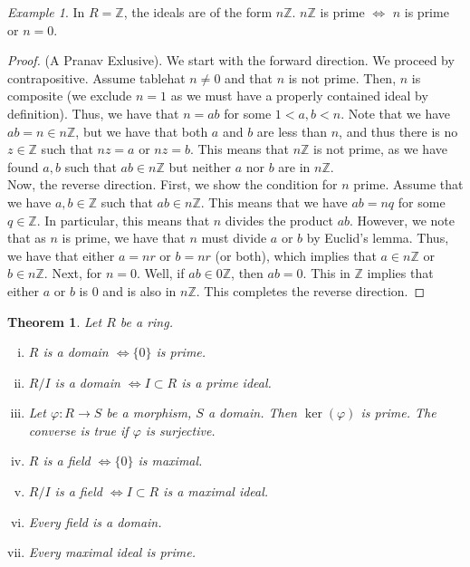 \documentclass{amsart}
\newcommand{\ZZ}{\mathbb{Z}}
\newtheorem{thm}{Theorem}[section]
\theoremstyle{definition}
\theoremstyle{remark}
\newtheorem*{ex}{Example}
\begin{document}
\begin{ex}
    In $R = \ZZ$, the ideals are of the form $n\ZZ$. $n\ZZ$ is prime $\iff$ $n$ is prime or $n = 0$.
\end{ex}
\begin{proof}
    (A Pranav Exlusive). We start with the forward direction. We proceed by contrapositive.
    Assume tablehat $n \neq 0$ and that $n$ is not prime. Then, $n$ is composite (we exclude $n = 1$ as
    we must have a properly contained ideal by definition). Thus, we have that $n = ab$ for some $1 < a,b < n$.
    Note that we have $ab = n \in n\ZZ$, but we have that both $a$ and $b$ are less than $n$, and thus there is no $z \in \ZZ$
    such that $nz = a$ or $nz = b$. This means that $n\ZZ$ is not prime, as we have found $a,b$ such that
    $ab \in n\ZZ$ but neither $a$ nor $b$ are in $n\ZZ$. \\
    Now, the reverse direction. First, we show the condition for $n$ prime. Assume that we have $a,b \in \ZZ$ such that $ab \in n\ZZ$.
    This means that we have $ab = nq$ for some $q \in \ZZ$. In particular, this means that $n$ divides
    the product $ab$. However, we note that as $n$ is prime, we have that $n$ must divide $a$
    or $b$ by Euclid's lemma. Thus, we have that either $a = nr$ or $b = nr$ (or both), which implies
    that $a \in n\ZZ$ or $b \in n\ZZ$. Next, for $n = 0$. Well, if $ab \in 0\ZZ$, then $ab = 0$. This in $\ZZ$ implies
    that either $a$ or $b$  is $0$ and is also in $n\ZZ$. This completes the reverse direction.
\end{proof}
\begin{thm}
    Let $R$ be a ring.
    \begin{enumerate}[i)]
        \item $R$ is a domain $\iff \{0\}$ is prime.
        \item $R / I$ is a domain $\iff I \subset R$ is a prime ideal.
        \item Let $\varphi: R \rightarrow S$ be a morphism, $S$ a domain. Then
        $\ker(\varphi)$ is prime. The converse is true if $\varphi$ is surjective.
        \item $R$ is a field $\iff \{0\}$ is maximal.
        \item $R / I$ is a field $\iff I \subset R$ is a maximal ideal.
        \item Every field is a domain.
        \item Every maximal ideal is prime.
    \end{enumerate}
\end{thm}
\end{document}
